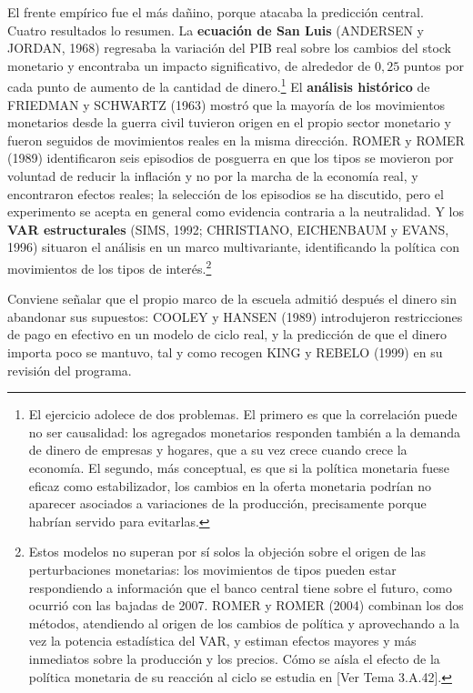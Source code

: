 \documentclass[10pt,a4paper]{article}
\newcommand{\authorfont}[1]{{\fontfamily{EBGaramond-TLF}\selectfont #1}}
\begin{document}
El frente empírico fue el más dañino, porque atacaba la predicción central. Cuatro resultados lo resumen. La \textbf{ecuación de San Luis} (ANDERSEN y JORDAN, 1968) regresaba la variación del PIB real sobre los cambios del stock monetario y encontraba un impacto significativo, de alrededor de $0{,}25$ puntos por cada punto de aumento de la cantidad de dinero.\footnote{%
    El ejercicio adolece de dos problemas. El primero es que la correlación puede no ser causalidad: los agregados monetarios responden también a la demanda de dinero de empresas y hogares, que a su vez crece cuando crece la economía. El segundo, más conceptual, es que si la política monetaria fuese eficaz como estabilizador, los cambios en la oferta monetaria podrían no aparecer asociados a variaciones de la producción, precisamente porque habrían servido para evitarlas.
} El \textbf{análisis histórico} de FRIEDMAN y SCHWARTZ (1963) mostró que la mayoría de los movimientos monetarios desde la guerra civil tuvieron origen en el propio sector monetario y fueron seguidos de movimientos reales en la misma dirección. ROMER y ROMER (1989) identificaron seis episodios de posguerra en que los tipos se movieron por voluntad de reducir la inflación y no por la marcha de la economía real, y encontraron efectos reales; la selección de los episodios se ha discutido, pero el experimento se acepta en general como evidencia contraria a la neutralidad. Y los \textbf{VAR estructurales} (SIMS, 1992; CHRISTIANO, EICHENBAUM y EVANS, 1996) situaron el análisis en un marco multivariante, identificando la política con movimientos de los tipos de interés.\footnote%
{   Estos modelos no superan por sí solos la objeción sobre el origen de las perturbaciones monetarias: los movimientos de tipos pueden estar respondiendo a información que el banco central tiene sobre el futuro, como ocurrió con las bajadas de 2007. ROMER y ROMER (2004) combinan los dos métodos, atendiendo al origen de los cambios de política y aprovechando a la vez la potencia estadística del VAR, y estiman efectos mayores y más inmediatos sobre la producción y los precios. Cómo se aísla el efecto de la política monetaria de su reacción al ciclo se estudia en [\authorfont{Ver Tema 3.A.42}].
}

Conviene señalar que el propio marco de la escuela admitió después el dinero sin abandonar sus supuestos: COOLEY y HANSEN (1989) introdujeron restricciones de pago en efectivo en un modelo de ciclo real, y la predicción de que el dinero importa poco se mantuvo, tal y como recogen KING y REBELO (1999) en su revisión del programa.
\end{document}
